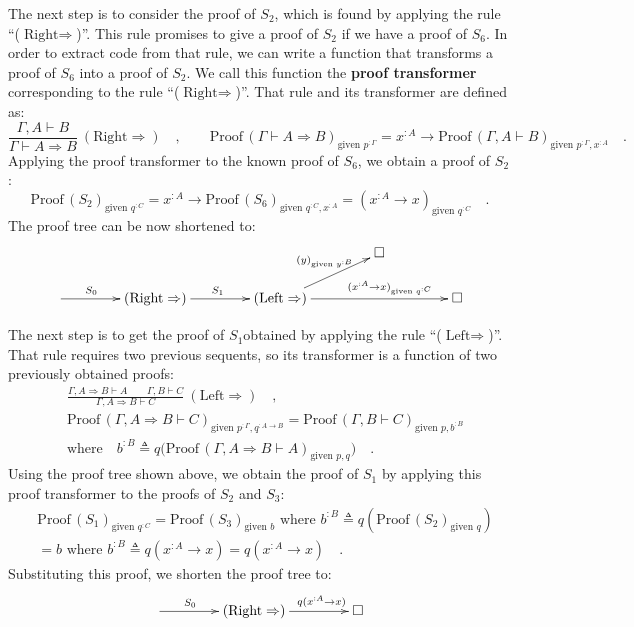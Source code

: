 The next step is to consider the proof of $S_{2}$, which is found
by applying the rule \textsf{``}($\text{Right}\Rightarrow$)\textsf{''}. This rule
promises to give a proof of $S_{2}$ if we have a proof of $S_{6}$.
In order to extract code from that rule, we can write a function that
transforms a proof of $S_{6}$ into a proof of $S_{2}$. We call this
function the \textbf{proof transformer}
corresponding to the rule \textsf{``}($\text{Right}\Rightarrow$)\textsf{''}. That
rule and its transformer are defined as:
\[
\frac{\Gamma,A\vdash B}{\Gamma\vdash A\Rightarrow B}~(\text{Right}\Rightarrow)\quad,\quad\quad\text{Proof}\,(\Gamma\vdash A\Rightarrow B)_{\text{given }p^{:\Gamma}}=x^{:A}\rightarrow\text{Proof}\,(\Gamma,A\vdash B)_{\text{given }p^{:\Gamma},x^{:A}}\quad.
\]
Applying the proof transformer to the known proof of $S_{6}$, we
obtain a proof of $S_{2}$:
\[
\text{Proof}\,(S_{2})_{\text{given }q^{:C}}=x^{:A}\rightarrow\text{Proof}\,(S_{6})_{\text{given }q^{:C},x^{:A}}=(x^{:A}\rightarrow x)_{\text{given }q^{:C}}\quad.
\]
The proof tree can be now shortened to:
\[
\xymatrix{\xyScaleY{1.5pc}\xyScaleX{3.5pc} &  &  & \square\\
\ar[r]\sp(0.35){S_{0}} & (\text{Right}\Rightarrow)\ar[r]\sp(0.5){S_{1}} & (\text{Left}\Rightarrow)\ar[rr]\sp(0.62){(x^{:A}\rightarrow x)_{\text{given }q^{:C}}}\ar[ru]\sp(0.6){(y)_{\text{given }y^{:B}}} &  & \square
}
\]

The next step is to get the proof of $S_{1}$obtained by applying
the rule \textsf{``}($\text{Left}\Rightarrow$)\textsf{''}. That rule requires two
previous sequents, so its transformer is a function of two previously
obtained proofs:
\begin{align*}
 & \frac{\Gamma,A\Rightarrow B\vdash A\quad\quad\Gamma,B\vdash C}{\Gamma,A\Rightarrow B\vdash C}~(\text{Left}\Rightarrow)\quad,\\
 & \text{Proof}\,(\Gamma,A\Rightarrow B\vdash C)_{\text{given }p^{:\Gamma},q^{:A\rightarrow B}}=\text{Proof}\,(\Gamma,B\vdash C)_{\text{given }p,b^{:B}}\\
 & \text{where}\quad b^{:B}\triangleq q\big(\text{Proof}\,(\Gamma,A\Rightarrow B\vdash A)_{\text{given }p,q}\big)\quad.
\end{align*}
Using the proof tree shown above, we obtain the proof of $S_{1}$
by applying this proof transformer to the proofs of $S_{2}$ and $S_{3}$:
\begin{align*}
 & \text{Proof}\,(S_{1})_{\text{given }q^{:C}}=\text{Proof}\,(S_{3})_{\text{given }b}\text{ where }b^{:B}\triangleq q(\text{Proof}\,(S_{2})_{\text{given }q})\\
 & =b\text{ where }b^{:B}\triangleq q(x^{:A}\rightarrow x)=q(x^{:A}\rightarrow x)\quad.
\end{align*}
Substituting this proof, we shorten the proof tree to:
\[
\xymatrix{\xyScaleY{1.5pc}\xyScaleX{3.5pc}\ar[r]\sp(0.35){S_{0}} & (\text{Right}\Rightarrow)\ar[r]\sp(0.65){q(x^{:A}\rightarrow x)} & \square}
\]

